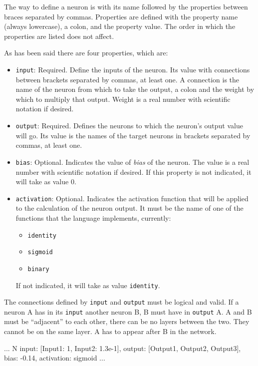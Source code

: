 \documentclass[a4paper]{article}
\begin{document}
The way to define a neuron is with its name followed by the properties between braces separated by commas. Properties are defined with the property name (always lowercase), a colon, and the property value. The order in which the properties are listed does not affect.

As has been said there are four properties, which are:
\begin{itemize}
\item \texttt{input}: Required. Define the inputs of the neuron. Its value with connections between brackets separated by commas, at least one. A connection is the name of the neuron from which to take the output, a colon and the weight by which to multiply that output. Weight is a real number with scientific notation if desired.

\item \texttt{output}: Required. Defines the neurons to which the neuron's output value will go. Its value is the names of the target neurons in brackets separated by commas, at least one.

\item \texttt{bias}: Optional. Indicates the value of \textit{bias} of the neuron. The value is a real number with scientific notation if desired. If this property is not indicated, it will take as value 0.

\item \texttt{activation}: Optional. Indicates the activation function that will be applied to the calculation of the neuron output. It must be the name of one of the functions that the language implements, currently:
\begin{itemize}
\item \texttt{identity}
\item \texttt{sigmoid}
\item \texttt{binary}
\end{itemize}
If not indicated, it will take as value \texttt{identity}.
\end{itemize}

The connections defined by \texttt{input} and \texttt{output} must be logical and valid. If a neuron A has in its \texttt{input} another neuron B, B must have in \texttt{output} A. A and B must be ``adjacent'' to each other, there can be no layers between the two. They cannot be on the same layer. A has to appear after B in the network.

\begin{codebox}
...
N {
	input: [Input1: 1, Input2: 1.3e-1],
	output: [Output1, Output2, Output3],
	bias: -0.14,
	activation: sigmoid
}
...
\end{codebox}
\end{document}
